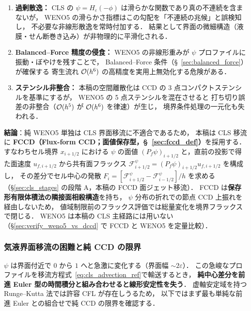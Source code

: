 \begin{enumerate}
  \item \textbf{過剰散逸：}
        CLS の $\psi = H_\varepsilon(-\phi)$ は滑らかな関数であり真の不連続を含まないが，
        WENO5 の滑らかさ指標はこの勾配を「不連続の兆候」と誤検知し，
        不必要な非線形散逸を常時付加する．
        結果として界面の微細構造（液膜・せん断巻き込み）が非物理的に平滑化される．

  \item \textbf{Balanced--Force 精度の侵食：}
        WENO5 の非線形重みが $\psi$ プロファイルに振動・ぼやけを残すことで，
        Balanced--Force 条件（§~\ref{sec:balanced_force}）が確保する
        寄生流れ $\mathcal{O}(h^6)$ の高精度を実用上無効化する危険がある．

  \item \textbf{ステンシル非整合：}
        本稿の空間離散化は CCD の 3 点コンパクトステンシルを基準にするが，
        WENO5 の 5 点ステンシルを混在させると
        打ち切り誤差の非整合（$\mathcal{O}(h^5)$ が $\mathcal{O}(h^6)$ を律速）が生じ，
        境界条件処理の一元化も失われる．
\end{enumerate}

\noindent
\textbf{結論}：純 WENO5 単独は CLS 界面移流に不適合であるため，
本稿は CLS 移流に \textbf{FCCD（Flux-form CCD；面値保存型，§~\ref{sec:fccd_def}）}を採用する．
すなわちセル境界 $x_{i+1/2}$ における $\psi$ の面値
$(P_f\psi)_{i+1/2}$ と，直前の投影で得た面速度
$u_{f,i+1/2}$ から共有面フラックス
$\mathcal{F}^{\psi}_{i+1/2}=(P_f\psi)_{i+1/2}u_{f,i+1/2}$ を構成し，
その差分でセル中心の発散
$F_i = [\mathcal{F}^{\psi}_{i+1/2} - \mathcal{F}^{\psi}_{i-1/2}]/h$ を求める
（§\ref{sec:cls_stages} の段階 A，本稿の FCCD 面ジェット移流）．
FCCD は\textbf{保存形有限体積法の隣接面相殺構造}を持ち，
$\psi$ 分布の折れでの節点 CCD 上振れを経由しないため，
値域制限前のフラックス評価では総量変化を境界フラックスで閉じる．
WENO5 は本稿の CLS 主経路には用いない
（§\ref{sec:verify_weno5_vs_dccd} で FCCD と WENO5 を定量比較）．

\subsubsection{気液界面移流の困難と純 CCD の限界}
\label{sec:advection_ccd_limit}

$\psi$ は界面付近で $0$ から $1$ へと急激に変化する（界面幅 $\sim 2\varepsilon$）．
この急峻なプロファイルを移流方程式~\eqref{eq:cls_advection_ref}で輸送するとき，
\textbf{純中心差分を前進 Euler 型の時間積分と組み合わせると線形安定性を失う}．
虚軸安定域を持つ Runge--Kutta 法では許容 CFL が存在しうるため，
以下ではまず最も単純な前進 Euler との組合せで純 CCD の限界を確認する．

